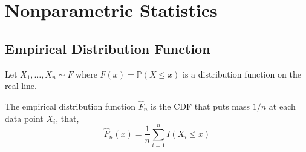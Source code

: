 \chapter{Nonparametric Statistics}

\section{Empirical Distribution Function}

Let $X_{1},\ldots,X_{n}\sim F$ where $F(x)=\mathbb{P}(X\leq x)$ is a distribution function on the real line.

\begin{definition}
    The empirical distribution function $\widehat{F}_{n}$ is the CDF that puts mass $1/n$ at each data point $X_{i}$, that,
    \begin{equation}
        \widehat{F}_{n}(x)=\frac{1}{n}\sum_{i=1}^{n}I\left(X_{i}\leq x\right)
    \end{equation}
\end{definition}
